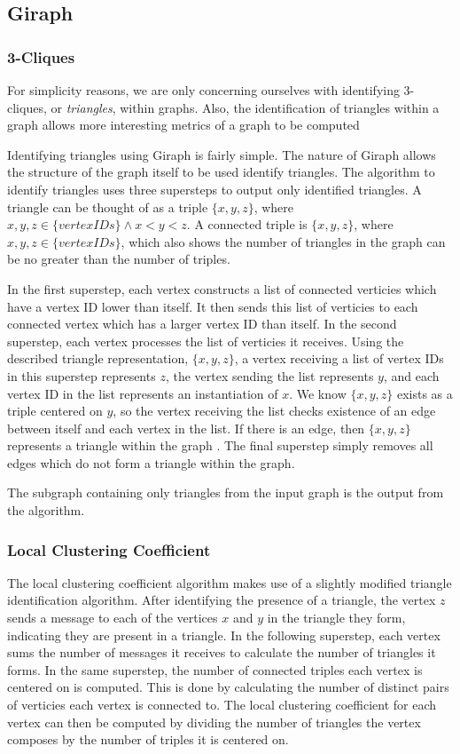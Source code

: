 \subsection{Giraph}

\subsubsection{3-Cliques}
For simplicity reasons, we are only concerning ourselves with identifying 3-cliques, or \emph{triangles}, within graphs. Also, the identification of triangles within a graph allows more interesting metrics of a graph to be computed

Identifying triangles using Giraph is fairly simple. The nature of Giraph allows the structure of the graph itself to be used identify triangles. The algorithm to identify triangles uses three supersteps to output only identified triangles. A triangle can be thought of as a triple $\{x, y, z\}$, where $x, y, z \in \{vertex IDs\} \land x < y < z$. A connected triple is $\{x, y, z\}$, where $x, y, z \in \{vertex IDs\}$, which also shows the number of triangles in the graph can be no greater than the number of triples.

In the first superstep, each vertex constructs a list of connected verticies which have a vertex ID lower than itself. It then sends this list of verticies to each connected vertex which has a larger vertex ID than itself. In the second superstep, each vertex processes the list of verticies it receives. Using the described triangle representation, $\{x, y, z\}$, a vertex receiving a list of vertex IDs in this superstep represents $z$, the vertex sending the list represents $y$, and each vertex ID in the list represents an instantiation of $x$. We know $\{x, y, z\}$ exists as a triple centered on $y$, so the vertex receiving the list checks existence of an edge between itself and each vertex in the list. If there is an edge, then $\{x, y, z\}$ represents a triangle within the graph \cite{cetindil11}. The final superstep simply removes all edges which do not form a triangle within the graph.

The subgraph containing only triangles from the input graph is the output from the algorithm.

\subsubsection{Local Clustering Coefficient}
The local clustering coefficient algorithm makes use of a slightly modified triangle identification algorithm. After identifying the presence of a triangle, the vertex $z$ sends a message to each of the vertices $x$ and $y$ in the triangle they form, indicating they are present in a triangle. In the following superstep, each vertex sums the number of messages it receives to calculate the number of triangles it forms. In the same superstep, the number of connected triples each vertex is centered on is computed. This is done by calculating the number of distinct pairs of verticies each vertex is connected to. The local clustering coefficient for each vertex can then be computed by dividing the number of triangles the vertex composes by the number of triples it is centered on.

